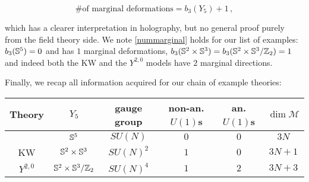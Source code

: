 \begin{equation}
	\text{\# of marginal deformations} = b_3(Y_5) + 1\,,
	\label{nummarginal}
\end{equation}

which has a clearer interpretation in holography, but no general proof purely from the field theory side. We note \eqref{nummarginal} holds for our list of examples: $b_3(\mathbb{S}^5) = 0$ and \SYM has $1$ marginal deformations, $b_3(\mathbb{S}^2 \times \mathbb{S}^3) = {b_3(\mathbb{S}^2 \times \mathbb{S}^3 / \mathbb{Z}_2)} = 1$ and indeed both the KW and the $Y^{2,0}$ models have $2$ marginal directions.

Finally, we recap all information acquired for our chain of example theories:

\begin{center}
	\begin{tabular}[]{cccccc}
Theory & $Y_5$	& gauge group &non-an. $U(1)$s & an. $U(1)$s & $\dim \mathcal{M}$ \\	\midrule \midrule
\SYM	& 	$\mathbb{S}^5$   & $SU(N)$	& $0$	 & $0$  & $3N$ \\
KW	& 	$\mathbb{S}^2\times\mathbb{S}^3$   & $SU(N)^2$	& $1$	 & $0$  & $3N+1$ \\
$Y^{2,0}$	& 	$\mathbb{S}^2\times\mathbb{S}^3/\mathbb{Z}_2$   & $SU(N)^4$	& $1$	 & $2$  & $3N+3$ \\
	\end{tabular}
\end{center}
